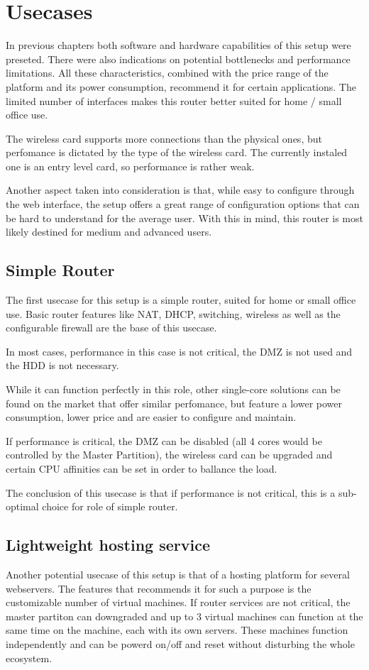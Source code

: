 \chapter{Usecases}
\label{chapter:usecases}
In previous chapters both software and hardware capabilities of this
setup were preseted.
There were also indications on potential bottlenecks and performance
limitations. All these characteristics, combined with the price range
of the platform and its power consumption, recommend it for certain
applications. The limited number of interfaces makes this router
better suited for home / small office use. 

The wireless card supports
more connections than the physical ones, but perfomance is dictated
by the type of the wireless card. The currently instaled one is an entry
level card, so performance is rather weak.

Another aspect taken into consideration is that, while easy to configure
through the web interface, the setup offers a great range of configuration
options that can be hard to understand for the average user. With this
in mind, this router is most likely destined for medium and advanced users.

\section{Simple Router}
\label{sec:use-router}
The first usecase for this setup is a simple router, suited for home
or small office use. Basic router features like NAT, DHCP, switching,
wireless as well as the configurable firewall are the base of this usecase.

In most cases, performance in this case is not critical,
the DMZ is not used and the HDD is not necessary.

While it can function perfectly in this role, other single-core solutions
can be found on the market that offer similar perfomance, but feature a
lower power consumption, lower price and are easier to configure and
maintain.

If performance is critical, the DMZ can be disabled (all 4 cores would be
controlled by the Master Partition), the wireless card can be upgraded
and certain CPU affinities can be set in order to ballance the load.

The conclusion of this usecase is that if performance is not critical,
this is a sub-optimal choice for role of simple router.

\section{Lightweight hosting service}
\label{sec:hosting-service}
Another potential usecase of this setup is that of a hosting platform for
several webservers. The features that recommends it for such a purpose
is the customizable number of virtual machines. If router services are
not critical, the master partiton can downgraded and up to 3 virtual
machines can function at the same time on the machine, each with its own
servers. These machines function independently and can be powerd on/off and
reset without disturbing the whole ecosystem.

